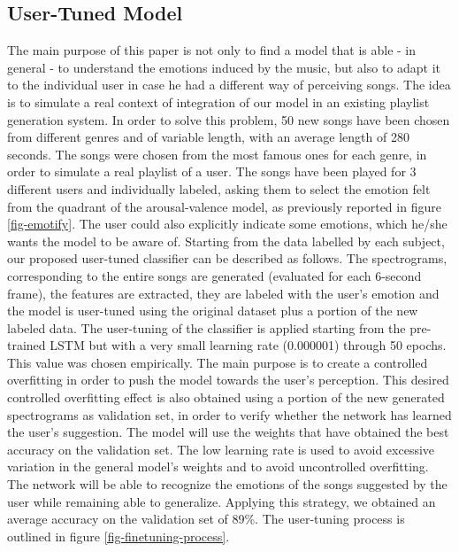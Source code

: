 \documentclass[runningheads]{llncs}
\begin{document}
\subsection{User-Tuned Model}
The main purpose of this paper is not only to find a model that is able - in general - to understand the emotions induced by the music, but also to adapt it to the individual user in case he had a different way of perceiving songs. The idea is to simulate a real context of integration of our model in an existing playlist generation system. 
In order to solve this problem, 50 new songs have been chosen from different genres and of variable length, with an average length of 280 seconds. The songs were chosen from the most famous ones for each genre, in order to simulate a real playlist of a user. The songs have been played for 3 different users and individually labeled, asking them to select the emotion felt from the quadrant of the arousal-valence model, as previously reported in figure \ref{fig-emotify}. The user could also explicitly indicate some emotions, which he/she wants the model to be aware of. 
Starting from the data labelled by each subject, our proposed user-tuned classifier can be described as follows. %
The spectrograms,  corresponding to the entire songs are generated (evaluated for each 6-second frame), the features are extracted, they are labeled with the user's emotion and the model is user-tuned using the original dataset plus a portion of the new labeled data. The user-tuning of the classifier is applied starting from the pre-trained LSTM but with a very small learning rate (0.000001) through 50 epochs. This value was chosen empirically. The main purpose is to create a controlled overfitting in order to push the model towards the user's perception. This desired controlled overfitting effect is also obtained using a portion of the new generated spectrograms as validation set, in order to verify whether the network has learned the user's suggestion. The model will use the weights that have obtained the best accuracy on the validation set. The low learning rate is used to avoid excessive variation in the general model's weights and to avoid uncontrolled overfitting. 
The network will be able to recognize the emotions of the songs suggested by the user while remaining able to generalize. Applying this strategy, we obtained an average accuracy on the validation set of 89\%. The user-tuning process is outlined in figure \ref{fig-finetuning-process}.
\end{document}
